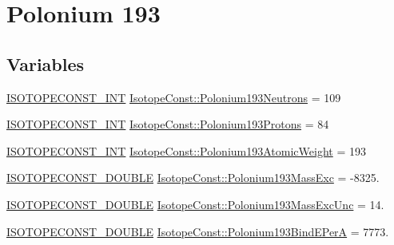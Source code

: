 \hypertarget{group___isotope_const-_polonium-_po193}{}\section{Polonium 193}
\label{group___isotope_const-_polonium-_po193}
\subsection*{Variables}
\begin{DoxyCompactItemize}
\item 
\mbox{\hyperlink{group___isotope_const-_macros_ga5f18360b3e99483a35c32d789e62621c}{I\+S\+O\+T\+O\+P\+E\+C\+O\+N\+S\+T\+\_\+\+I\+NT}} \mbox{\hyperlink{group___isotope_const-_polonium-_po193_gae8bca3b424757e16a7c3acbd9bf5ee55}{Isotope\+Const\+::\+Polonium193\+Neutrons}} = 109
\item 
\mbox{\hyperlink{group___isotope_const-_macros_ga5f18360b3e99483a35c32d789e62621c}{I\+S\+O\+T\+O\+P\+E\+C\+O\+N\+S\+T\+\_\+\+I\+NT}} \mbox{\hyperlink{group___isotope_const-_polonium-_po193_ga474c7395831c4ee70358d189b86f4642}{Isotope\+Const\+::\+Polonium193\+Protons}} = 84
\item 
\mbox{\hyperlink{group___isotope_const-_macros_ga5f18360b3e99483a35c32d789e62621c}{I\+S\+O\+T\+O\+P\+E\+C\+O\+N\+S\+T\+\_\+\+I\+NT}} \mbox{\hyperlink{group___isotope_const-_polonium-_po193_gaa07844586c7b46bf14afd9c99de052f5}{Isotope\+Const\+::\+Polonium193\+Atomic\+Weight}} = 193
\item 
\mbox{\hyperlink{group___isotope_const-_macros_ga8f45a7272ce02c0b4c65c44636ed719a}{I\+S\+O\+T\+O\+P\+E\+C\+O\+N\+S\+T\+\_\+\+D\+O\+U\+B\+LE}} \mbox{\hyperlink{group___isotope_const-_polonium-_po193_ga9cef1403c3101d9038634760b7fcde8d}{Isotope\+Const\+::\+Polonium193\+Mass\+Exc}} = -\/8325.
\item 
\mbox{\hyperlink{group___isotope_const-_macros_ga8f45a7272ce02c0b4c65c44636ed719a}{I\+S\+O\+T\+O\+P\+E\+C\+O\+N\+S\+T\+\_\+\+D\+O\+U\+B\+LE}} \mbox{\hyperlink{group___isotope_const-_polonium-_po193_ga8927dfbd90b0fe98ddb47773402f8ae7}{Isotope\+Const\+::\+Polonium193\+Mass\+Exc\+Unc}} = 14.
\item 
\mbox{\hyperlink{group___isotope_const-_macros_ga8f45a7272ce02c0b4c65c44636ed719a}{I\+S\+O\+T\+O\+P\+E\+C\+O\+N\+S\+T\+\_\+\+D\+O\+U\+B\+LE}} \mbox{\hyperlink{group___isotope_const-_polonium-_po193_ga2e7b0eb1b45c154c62714ba50147e8c2}{Isotope\+Const\+::\+Polonium193\+Bind\+E\+PerA}} = 7773.
\item 

\end{DoxyCompactItemize}
